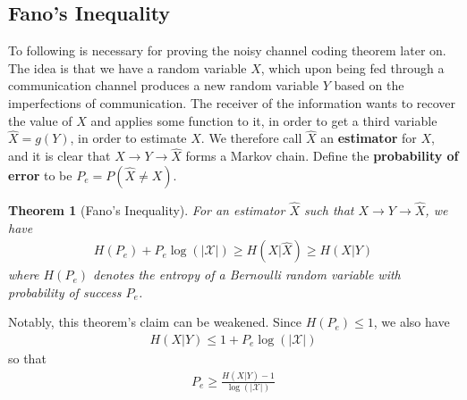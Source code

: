 \documentclass{article}
\theoremstyle{definition}
\theoremstyle{plain}
\newtheorem{theorem}{Theorem}[section]
\begin{document}
\subsection{Fano's Inequality}
To following is necessary for proving the noisy channel coding theorem later on. The idea is that we have a random variable $X$, which upon being fed through a communication channel produces a new random variable $Y$ based on the imperfections of communication. The receiver of the information wants to recover the value of $X$ and applies some function to it, in order to get a third variable $\hat{X} = g(Y)$, in order to estimate $X$. We therefore call $\hat{X}$ an \textbf{estimator} for $X$, and it is clear that $X \to Y \to \hat{X}$ forms a Markov chain. Define the \textbf{probability of error} to be $P_e = P(\hat{X} \neq X)$. 
\begin{theorem}[Fano's Inequality]
	For an estimator $\hat{X}$ such that $X \to Y \to \hat{X}$, we have 
	\begin{align}
		H(P_e)+P_e\log(|\mathcal{X}|) \geq H(X|\hat{X}) \geq H(X|Y)
	\end{align}
	where $H(P_e)$ denotes the entropy of a Bernoulli random variable with probability of success $P_e$. 
\end{theorem}
Notably, this theorem's claim can be weakened. Since $H(P_e) \leq 1$, we also have
\begin{align}
	H(X|Y) \leq 1+P_e\log(|\mathcal{X}|)
\end{align}
so that
\begin{align}
	P_e \geq \frac{H(X|Y)-1}{\log(|\mathcal{X}|)}
\end{align}
\end{document}
